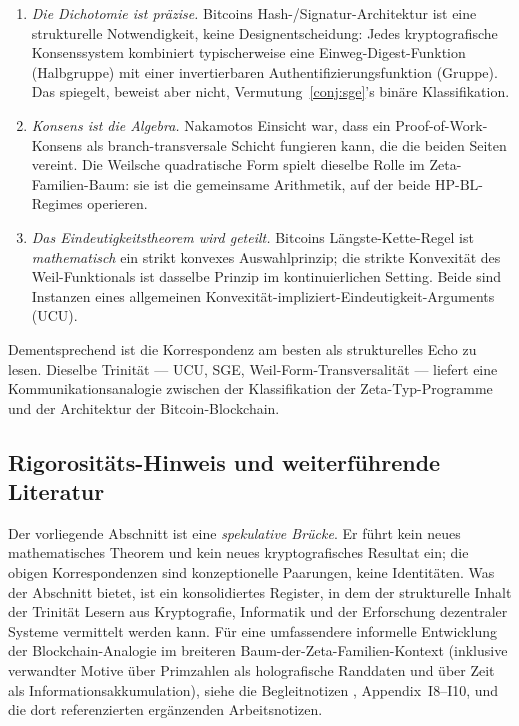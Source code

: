 \documentclass[11pt]{article}
\theoremstyle{definition}
\theoremstyle{remark}
\newcommand{\HBL}{\mathrm{HP\text{-}BL}}
\begin{document}
\begin{enumerate}
\item \emph{Die Dichotomie ist präzise.} Bitcoins Hash-/Signatur-Architektur
ist eine strukturelle Notwendigkeit, keine Designentscheidung: Jedes
kryptografische Konsenssystem kombiniert typischerweise eine Einweg-Digest-Funktion
(Halbgruppe) mit einer invertierbaren Authentifizierungsfunktion
(Gruppe). Das spiegelt, beweist aber nicht,
Vermutung~\ref{conj:sge}'s binäre Klassifikation.

\item \emph{Konsens ist die Algebra.} Nakamotos Einsicht war, dass ein
Proof-of-Work-Konsens als branch-transversale Schicht fungieren kann, die
die beiden Seiten vereint. Die Weilsche quadratische Form spielt dieselbe Rolle
im Zeta-Familien-Baum: sie ist die gemeinsame Arithmetik, auf der beide
$\HBL$-Regimes operieren.

\item \emph{Das Eindeutigkeitstheorem wird geteilt.} Bitcoins Längste-Kette-Regel
ist \emph{mathematisch} ein strikt konvexes Auswahlprinzip;
die strikte Konvexität des Weil-Funktionals ist dasselbe Prinzip im
kontinuierlichen Setting. Beide sind Instanzen eines allgemeinen
Konvexität-impliziert-Eindeutigkeit-Arguments (UCU).
\end{enumerate}

Dementsprechend ist die Korrespondenz am besten als strukturelles Echo zu lesen.
Dieselbe Trinität --- UCU, SGE, Weil-Form-Transversalität --- liefert eine
Kommunikationsanalogie zwischen der Klassifikation der Zeta-Typ-Programme und
der Architektur der Bitcoin-Blockchain.

\subsection{Rigorositäts-Hinweis und weiterführende Literatur}
\label{sec:blockchain-disclaimer}

Der vorliegende Abschnitt ist eine \emph{spekulative Brücke}. Er führt kein
neues mathematisches Theorem und kein neues kryptografisches Resultat ein; die
obigen Korrespondenzen sind konzeptionelle Paarungen, keine Identitäten.
Was der Abschnitt bietet, ist ein konsolidiertes Register, in dem
der strukturelle Inhalt der Trinität Lesern
aus Kryptografie, Informatik und der Erforschung dezentraler Systeme
vermittelt werden kann. Für eine umfassendere informelle Entwicklung der Blockchain-Analogie
im breiteren Baum-der-Zeta-Familien-Kontext (inklusive
verwandter Motive über Primzahlen als holografische Randdaten und über Zeit
als Informationsakkumulation), siehe die Begleitnotizen
\cite{MetaGalerkinBridge}, Appendix~I8--I10, und die dort referenzierten ergänzenden Arbeitsnotizen.
\end{document}
